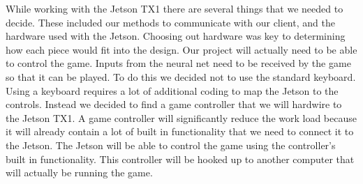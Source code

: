 \documentclass[onecolumn, draftclsnofoot,10pt, compsoc]{IEEEtran}
\begin{document}
While working with the Jetson TX1 there are several things that we needed to decide.
These included our methods to communicate with our client, and the hardware used with the Jetson.
Choosing out hardware was key to determining how each piece would fit into the design.
\newline
\newline
Our project will actually need to be able to control the game.
Inputs from the neural net need to be received by the game so that it can be played.
To do this we decided not to use the standard keyboard.
Using a keyboard requires a lot of additional coding to map the Jetson to the controls.
Instead we decided to find a game controller that we will hardwire to the Jetson TX1.
A game controller will significantly reduce the work load because it will already contain a lot of built in functionality that we need to connect it to the Jetson.
The Jetson will be able to control the game using the controller's built in functionality.
This controller will be hooked up to another computer that will actually be running the game.
\end{document}
